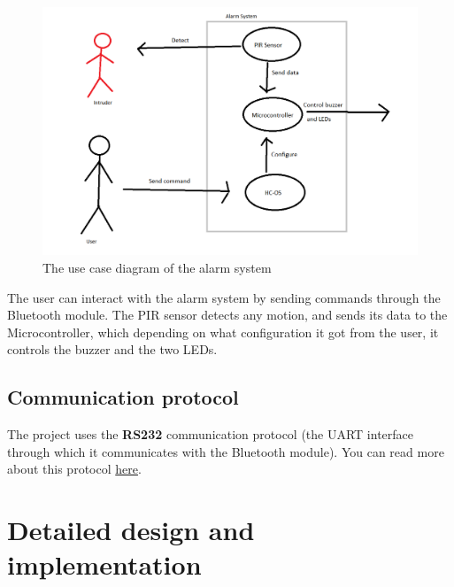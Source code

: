 \documentclass[a4paper,12pt]{report}
\begin{document}
\begin{figure}[h]

\centering
\includegraphics[width=1\textwidth]{fig/useCase}
\caption{The use case diagram of the alarm system}
\label{fig:fig2}

\end{figure}

The user can interact with the alarm system by sending commands through the Bluetooth module. The PIR sensor detects any motion, and sends its data to the Microcontroller, which depending on what configuration it got from the user, it controls the buzzer and the two LEDs.

\section{Communication protocol}

The project uses the \textbf{RS232} communication protocol (the UART interface through which it communicates with the Bluetooth module).
You can read more about this protocol \href{https://circuitdigest.com/article/rs232-serial-communication-protocol-basics-specifications}{here}.

\chapter{Detailed design and implementation}
\label{chap:c3}

\colorbox{blue!20}{}
\end{document}
